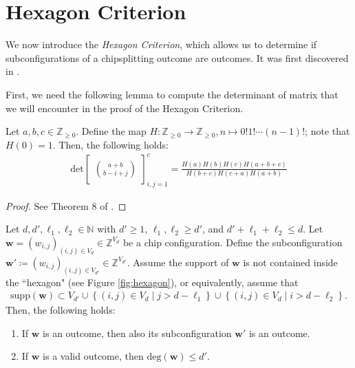 \chapter{Hexagon Criterion}

We now introduce the \emph{Hexagon Criterion}, which allows us to determine if subconfigurations of a chipsplitting outcome are outcomes. It was first discovered in \cite{bik2022classifying}.

First, we need the following lemma to compute the determinant of matrix that we will encounter in the proof of the Hexagon Criterion.

\begin{lemma}\label{lemma:grinberghyperfactorial}
    Let \( a,b,c \in \mathbb{Z}_{\geq 0} \). Define the map \( H:  \mathbb{Z}_{\geq 0} \to  \mathbb{Z}_{\geq 0}, n \mapsto 0! 1! \cdots (n-1)! \); note that \( H(0) = 1 \). Then, the following holds:
    \begin{align*}
        \mathrm{det}\begin{bmatrix}
            \binom{a+b}{b-i+j}
        \end{bmatrix}_{i,j = 1}^c = \frac{H(a)H(b)H(c)H(a+b+c)}{H(b+c)H(c+a)H(a+b)}
    \end{align*} 
\end{lemma}

\begin{proof}
    See Theorem 8 of \cite{grinberghyperfactorial}.
\end{proof}

\begin{proposition}
    Let \( d, d', \ell_1, \ell_2 \in \mathbb{N} \) with \( d' \geq 1 \), \( \ell_1, \ell_2 \geq d' \), and \( d' + \ell_1 + \ell_2 \leq d \). Let \( \mathbf{w} = (w_{i,j})_{(i,j) \in V_d} \in \mathbb{Z}^{V_d} \) be a chip configuration. Define the subconfiguration \( \mathbf{w}' \coloneqq (w_{i,j})_{(i,j) \in V_{d'}} \in \mathbb{Z}^{V_{d'}}\). Assume the support of \( \mathbf{w} \) is not contained inside the ``hexagon" (see Figure \ref{fig:hexagon}), or equivalently, assume that
    \begin{align*}
        \mathrm{supp}(\mathbf{w}) \subset V_{d'}  \cup \left\{ (i,j) \in V_d \mid j > d - \ell_1 \right\} \cup \left\{ (i,j) \in V_d \mid i > d - \ell_2 \right\}.
    \end{align*}
    Then, the following holds:
    \begin{enumerate}
        \item If \( \mathbf{w} \) is an outcome, then also its subconfiguration \( \mathbf{w}' \) is an outcome.
        \item If \( \mathbf{w} \) is a valid outcome, then \( \mathrm{deg}(\mathbf{w}) \leq d' \).
    \end{enumerate}
\end{proposition}

